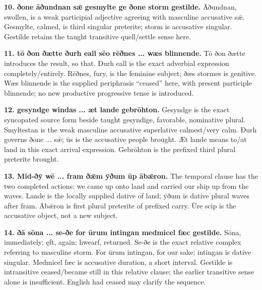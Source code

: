 \textbf{10. ðone āðundnan sǣ gesmylte ge ðone storm gestilde.} Āðundnan, swollen, is a weak participial adjective agreeing with masculine accusative sǣ. Gesmylte, calmed, is third singular preterite; storm is accusative singular. Gestilde retains the taught transitive quell/\allowbreak{}settle sense here.

\textbf{11. tō ðon ðætte ðurh eall sēo rēðnes ... wæs blinnende.} Tō ðon ðætte introduces the result, so that. Ðurh eall is the exact adverbial expression completely/\allowbreak{}entirely. Rēðnes, fury, is the feminine subject; ðæs stormes is genitive. Wæs blinnende is the supplied periphrasis “ceased” here, with present participle blinnende; no new productive progressive tense is introduced.

\textbf{12. gesyndge windas ... æt lande gebrōhton.} Gesyndge is the exact syncopated source form beside taught gesyndige, favorable, nominative plural. Smyltestan is the weak masculine accusative superlative calmest/\allowbreak{}very calm. Ðurh governs ðone ... sǣ; ūs is the accusative people brought. Æt lande means to/\allowbreak{}at land in this exact arrival expression. Gebrōhton is the prefixed third plural preterite brought.

\textbf{13. Mid-ðȳ wē ... fram ðǣm ȳðum ūp ābǣron.} The temporal clause has the two completed actions: we came up onto land and carried our ship up from the waves. Lande is the locally supplied dative of land; ȳðum is dative plural waves after fram. Ābǣron is first plural preterite of prefixed carry. Ūre scip is the accusative object, not a new subject.

\textbf{14. ðā sōna ... se-ðe for ūrum intingan medmicel fæc gestilde.} Sōna, immediately; ęft, again; hwearf, returned. Se-ðe is the exact relative complex referring to masculine storm. For ūrum intingan, for our sake; intingan is dative singular. Medmicel fæc is accusative duration, a short interval. Gestilde is intransitive ceased/\allowbreak{}became still in this relative clause; the earlier transitive sense alone is insufficient. English had ceased may clarify the sequence.

